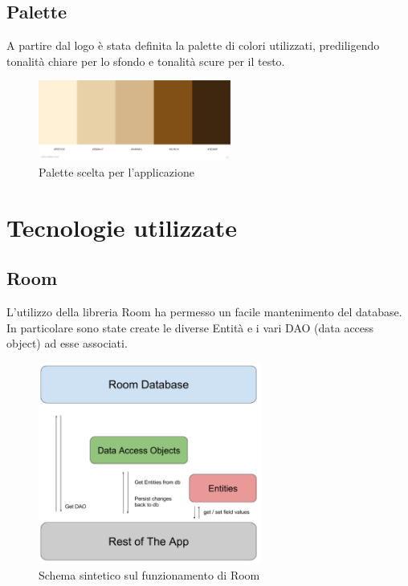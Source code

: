 \documentclass[12pt]{article}
\begin{document}
\subsection{Palette}
A partire dal logo è stata definita la palette di colori utilizzati, prediligendo tonalità chiare per lo sfondo e tonalità scure per il testo.
\begin{figure}[H]
\centering
\includegraphics[height=100px]{palette.jpeg}
\caption{\label{fig:palette}Palette scelta per l'applicazione}
\end{figure}



\newpage
\section{Tecnologie utilizzate}

\subsection{Room}
L'utilizzo della libreria Room ha permesso un facile mantenimento del database. \newline
In particolare sono state create le diverse Entità e i vari DAO (data access object) ad esse associati.
\begin{figure}[H]
\centering
\includegraphics[height=250px]{room.png}
\caption{\label{fig:room}Schema sintetico sul funzionamento di Room}
\end{figure}
\end{document}
